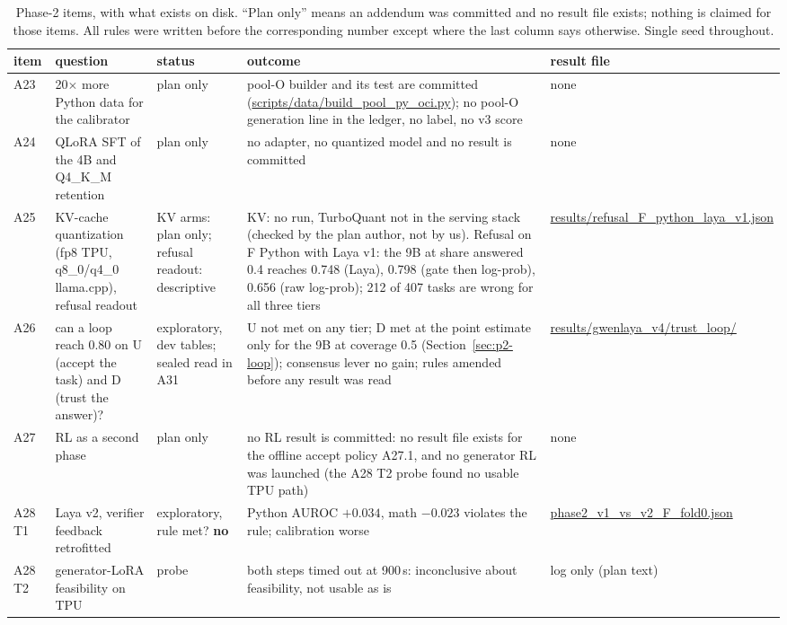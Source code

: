 \documentclass[11pt,a4paper]{article}
\begin{document}
\begin{table}[!htbp]\centering\scriptsize\setlength{\tabcolsep}{3pt}
\caption{Phase-2 items, with what exists on disk. ``Plan only'' means an addendum was committed and no result file exists; nothing is claimed for those items. All rules were written before the corresponding number except where the last column says otherwise. Single seed throughout.}\label{tab:p2-status}
\begin{tabular}{l p{3.6cm} p{2.3cm} p{4.8cm} p{3.0cm}}\toprule
item & question & status & outcome & result file\\\midrule
A23 & 20$\times$ more Python data for the calibrator & plan only & pool-O builder and its test are committed (\url{scripts/data/build_pool_py_oci.py}); no pool-O generation line in the ledger, no label, no v3 score & none\\
A24 & QLoRA SFT of the 4B and Q4\_K\_M retention & plan only & no adapter, no quantized model and no result is committed & none\\
A25 & KV-cache quantization (fp8 TPU, q8\_0/q4\_0 llama.cpp), refusal readout & KV arms: plan only; refusal readout: descriptive & KV: no run, TurboQuant not in the serving stack (checked by the plan author, not by us). Refusal on F Python with Laya v1: the 9B at share answered 0.4 reaches 0.748 (Laya), 0.798 (gate then log-prob), 0.656 (raw log-prob); 212 of 407 tasks are wrong for all three tiers & \url{results/refusal_F_python_laya_v1.json}\\
A26 & can a loop reach 0.80 on U (accept the task) and D (trust the answer)? & exploratory, dev tables; sealed read in A31 & U not met on any tier; D met at the point estimate only for the 9B at coverage 0.5 (Section~\ref{sec:p2-loop}); consensus lever no gain; rules amended before any result was read & \url{results/gwenlaya_v4/trust_loop/}\\
A27 & RL as a second phase & plan only & no RL result is committed: no result file exists for the offline accept policy A27.1, and no generator RL was launched (the A28 T2 probe found no usable TPU path) & none\\
A28 T1 & Laya v2, verifier feedback retrofitted & exploratory, rule met? \textbf{no} & Python AUROC $+0.034$, math $-0.023$ violates the rule; calibration worse & \url{phase2_v1_vs_v2_F_fold0.json}\\
A28 T2 & generator-LoRA feasibility on TPU & probe & both steps timed out at 900\,s: inconclusive about feasibility, not usable as is & log only (plan text)\\

\end{tabular}
\end{table}
\end{document}
